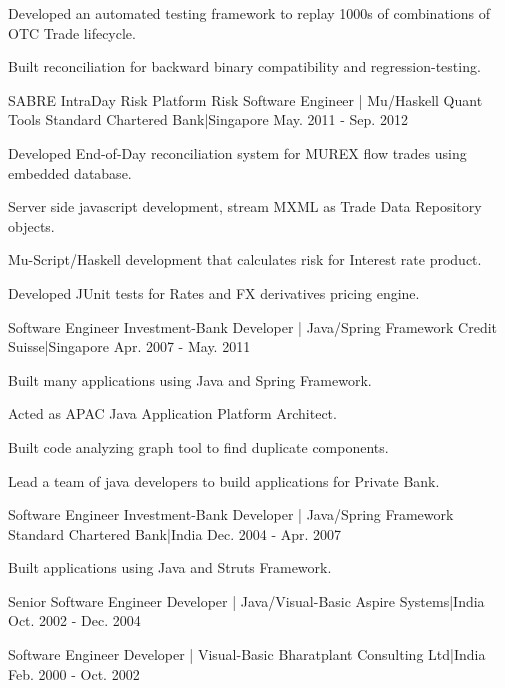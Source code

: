 \begin{cventries}
{\begin{cvitems}
        \item {Developed an automated testing framework to replay 1000s of combinations of OTC Trade lifecycle.}
        \item {Built reconciliation for backward binary compatibility and regression-testing.}
      \end{cvitems}
    }
  \cventry
    {SABRE IntraDay Risk Platform}
    {Risk Software Engineer | Mu/Haskell Quant Tools}
    {Standard Chartered Bank|Singapore}
    {May. 2011 - Sep. 2012}
    {
      \begin{cvitems}
        \item {Developed End-of-Day reconciliation system for MUREX flow trades using embedded database.}
        \item {Server side javascript development, stream MXML as Trade Data Repository objects.}
        \item {Mu-Script/Haskell development that calculates risk for Interest rate product.}
        \item {Developed JUnit tests for Rates and FX derivatives pricing engine.}
      \end{cvitems}
    }
  \cventry
    {Software Engineer}
    {Investment-Bank Developer | Java/Spring Framework}
    {Credit Suisse|Singapore}
    {Apr. 2007 - May. 2011}
    {
      \begin{cvitems}
        \item {Built many applications using Java and Spring Framework.}
        \item {Acted as APAC Java Application Platform Architect.}
        \item {Built code analyzing graph tool to find duplicate components.}
        \item {Lead a team of java developers to build applications for Private Bank.}
      \end{cvitems}
    }
  \cventry
    {Software Engineer}
    {Investment-Bank Developer | Java/Spring Framework}
    {Standard Chartered Bank|India}
    {Dec. 2004 - Apr. 2007}
    {
      \begin{cvitems}
        \item {Built applications using Java and Struts Framework.}
      \end{cvitems}
    }
  \cventry
    {Senior Software Engineer}
    {Developer | Java/Visual-Basic}
    {Aspire Systems|India}
    {Oct. 2002 - Dec. 2004}
    {
      \begin{cvitems}
      \end{cvitems}
    }
  \cventry
    {Software Engineer}
    {Developer | Visual-Basic}
    {Bharatplant Consulting Ltd|India}
    {Feb. 2000 - Oct. 2002}
    {
      \begin{cvitems}
      \end{cvitems}
    }
\end{cventries}

